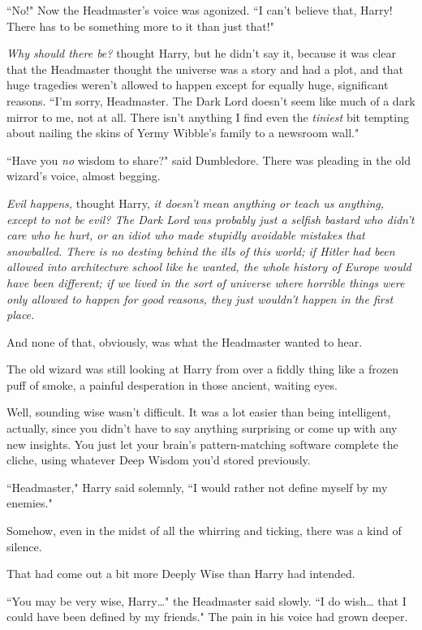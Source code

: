 ``No!" Now the Headmaster's voice was agonized. ``I can't believe that, Harry! There has to be something more to it than just that!"

\emph{Why should there be?} thought Harry, but he didn't say it, because it was clear that the Headmaster thought the universe was a story and had a plot, and that huge tragedies weren't allowed to happen except for equally huge, significant reasons. ``I'm sorry, Headmaster. The Dark Lord doesn't seem like much of a dark mirror to me, not at all. There isn't anything I find even the \emph{tiniest} bit tempting about nailing the skins of Yermy Wibble's family to a newsroom wall."

``Have you \emph{no} wisdom to share?" said Dumbledore. There was pleading in the old wizard's voice, almost begging.

\emph{Evil happens,} thought Harry, \emph{it doesn't mean anything or teach us anything, except to not be evil? The Dark Lord was probably just a selfish bastard who didn't care who he hurt, or an idiot who made stupidly avoidable mistakes that snowballed. There is no destiny behind the ills of this world; if Hitler had been allowed into architecture school like he wanted, the whole history of Europe would have been different; if we lived in the sort of universe where horrible things were only allowed to happen for good reasons, they just wouldn't happen in the first place.}

And none of that, obviously, was what the Headmaster wanted to hear.

The old wizard was still looking at Harry from over a fiddly thing like a frozen puff of smoke, a painful desperation in those ancient, waiting eyes.

Well, sounding wise wasn't difficult. It was a lot easier than being intelligent, actually, since you didn't have to say anything surprising or come up with any new insights. You just let your brain's pattern-matching software complete the cliche, using whatever Deep Wisdom you'd stored previously.

``Headmaster," Harry said solemnly, ``I would rather not define myself by my enemies."

Somehow, even in the midst of all the whirring and ticking, there was a kind of silence.

That had come out a bit more Deeply Wise than Harry had intended.

``You may be very wise, Harry{\ldots}" the Headmaster said slowly. ``I do wish{\ldots} that I could have been defined by my friends." The pain in his voice had grown deeper.

